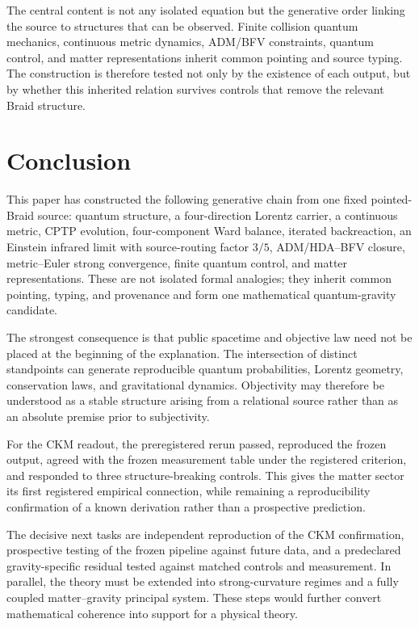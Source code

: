 \documentclass[11pt]{article}
\theoremstyle{definition}
\theoremstyle{remark}
\begin{document}
The central content is not any isolated equation but the generative order linking the source to structures that can be observed. Finite collision quantum mechanics, continuous metric dynamics, ADM/BFV constraints, quantum control, and matter representations inherit common pointing and source typing. The construction is therefore tested not only by the existence of each output, but by whether this inherited relation survives controls that remove the relevant Braid structure.

\section{Conclusion}

This paper has constructed the following generative chain from one fixed pointed-Braid source: quantum structure, a four-direction Lorentz carrier, a continuous metric, CPTP evolution, four-component Ward balance, iterated backreaction, an Einstein infrared limit with source-routing factor $3/5$, ADM/HDA--BFV closure, metric--Euler strong convergence, finite quantum control, and matter representations. These are not isolated formal analogies; they inherit common pointing, typing, and provenance and form one mathematical quantum-gravity candidate.

The strongest consequence is that public spacetime and objective law need not be placed at the beginning of the explanation. The intersection of distinct standpoints can generate reproducible quantum probabilities, Lorentz geometry, conservation laws, and gravitational dynamics. Objectivity may therefore be understood as a stable structure arising from a relational source rather than as an absolute premise prior to subjectivity.

For the CKM readout, the preregistered rerun passed, reproduced the frozen output, agreed with the frozen measurement table under the registered criterion, and responded to three structure-breaking controls. This gives the matter sector its first registered empirical connection, while remaining a reproducibility confirmation of a known derivation rather than a prospective prediction.

The decisive next tasks are independent reproduction of the CKM confirmation, prospective testing of the frozen pipeline against future data, and a predeclared gravity-specific residual tested against matched controls and measurement. In parallel, the theory must be extended into strong-curvature regimes and a fully coupled matter--gravity principal system. These steps would further convert mathematical coherence into support for a physical theory.
\end{document}
